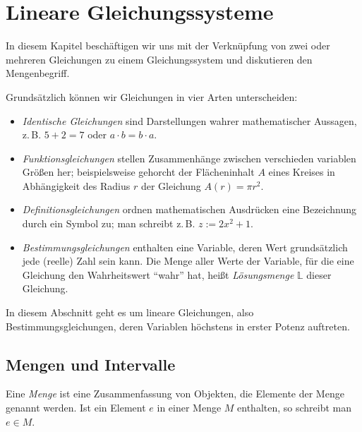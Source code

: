 \thispagestyle{plain}
\section{Lineare Gleichungssysteme}

In diesem Kapitel beschäftigen wir uns mit der Verknüpfung von zwei oder mehreren Gleichungen zu einem Gleichungssystem und diskutieren den Mengenbegriff.

Grundsätzlich können wir Gleichungen in vier Arten unterscheiden:
\begin{itemize}
    \item \emph{Identische Gleichungen} sind Darstellungen wahrer mathematischer Aussagen, z.\,B. $5+2=7$ oder $a\cdot b = b\cdot a$. 
    \item \emph{Funktionsgleichungen} stellen Zusammenhänge zwischen verschieden variablen Größen her; beispielsweise gehorcht der Flächeninhalt $A$ eines Kreises in Abhängigkeit des Radius $r$ der Gleichung $A(r) = \pi r^2$. 
    \item \emph{Definitionsgleichungen} ordnen mathematischen Ausdrücken eine Bezeichnung durch ein Symbol zu; man schreibt z.\,B. $z := 2x^2 +1$.
    \item \emph{Bestimmungsgleichungen} enthalten eine Variable, deren Wert grundsätzlich jede (reelle) Zahl sein kann. Die Menge aller Werte der Variable, für die eine Gleichung den Wahrheitswert ``wahr'' hat, heißt \emph{Lösungsmenge} $\mathbb{L}$ dieser Gleichung.
\end{itemize}
In diesem Abschnitt geht es um lineare Gleichungen, also Bestimmungsgleichungen, deren Variablen höchstens in erster Potenz auftreten.


\subsection{Mengen und Intervalle}

Eine \emph{Menge} ist eine Zusammenfassung von Objekten, die Elemente der Menge genannt werden. Ist ein Element $e$ in einer Menge $M$ enthalten, so schreibt man $e \in M$.

